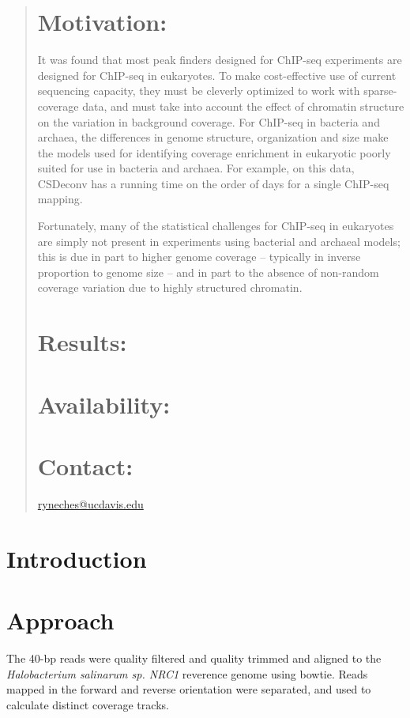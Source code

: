 \documentclass{bioinfo}
\begin{document}
\begin{abstract}
\section{Motivation:}

It was found that most peak finders designed for ChIP-seq experiments
are designed for ChIP-seq in eukaryotes. To make cost-effective use of
current sequencing capacity, they must be cleverly optimized to work
with sparse-coverage data, and must take into account the effect of
chromatin structure on the variation in background coverage. For
ChIP-seq in bacteria and archaea, the differences in genome structure,
organization and size make the models used for identifying coverage
enrichment in eukaryotic poorly suited for use in bacteria and
archaea. For example, on this data, CSDeconv has a running time on the
order of days for a single ChIP-seq mapping.


Fortunately, many of the statistical challenges for ChIP-seq in
eukaryotes are simply not present in experiments using bacterial and
archaeal models; this is due in part to higher genome coverage --
typically in inverse proportion to genome size -- and in part to the
absence of non-random coverage variation due to highly structured
chromatin.

\section{Results:}
\section{Availability:}
\section{Contact:} \href{ryneches@ucdavis.edu}{ryneches@ucdavis.edu}

\end{abstract}

\section{Introduction}
\section{Approach}
The 40-bp reads were quality filtered and quality trimmed and aligned
to the {\em Halobacterium salinarum sp. NRC1} reverence genome using
bowtie. Reads mapped in the forward and reverse orientation were
separated, and used to calculate distinct coverage tracks.
\end{document}
